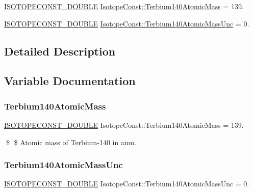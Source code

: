 \begin{DoxyCompactItemize}
\item 
\mbox{\hyperlink{group___isotope_const-_macros_ga8f45a7272ce02c0b4c65c44636ed719a}{I\+S\+O\+T\+O\+P\+E\+C\+O\+N\+S\+T\+\_\+\+D\+O\+U\+B\+LE}} \mbox{\hyperlink{group___isotope_const-_terbium-_tb140_ga8648710e17aa5d4e0621d2b32e031ee9}{Isotope\+Const\+::\+Terbium140\+Atomic\+Mass}} = 139.
\item 
\mbox{\hyperlink{group___isotope_const-_macros_ga8f45a7272ce02c0b4c65c44636ed719a}{I\+S\+O\+T\+O\+P\+E\+C\+O\+N\+S\+T\+\_\+\+D\+O\+U\+B\+LE}} \mbox{\hyperlink{group___isotope_const-_terbium-_tb140_gafd7dd55afe7f782f84767c1fdf59fb4a}{Isotope\+Const\+::\+Terbium140\+Atomic\+Mass\+Unc}} = 0.
\end{DoxyCompactItemize}


\subsection{Detailed Description}


\subsection{Variable Documentation}
\mbox{\label{group___isotope_const-_terbium-_tb140_ga8648710e17aa5d4e0621d2b32e031ee9}} 
\subsubsection{\texorpdfstring{Terbium140\+Atomic\+Mass}{Terbium140AtomicMass}}
{\footnotesize\ttfamily \mbox{\hyperlink{group___isotope_const-_macros_ga8f45a7272ce02c0b4c65c44636ed719a}{I\+S\+O\+T\+O\+P\+E\+C\+O\+N\+S\+T\+\_\+\+D\+O\+U\+B\+LE}} Isotope\+Const\+::\+Terbium140\+Atomic\+Mass = 139.}

\$ \$ Atomic mass of Terbium-\/140 in amu. \mbox{\label{group___isotope_const-_terbium-_tb140_gafd7dd55afe7f782f84767c1fdf59fb4a}} 
\subsubsection{\texorpdfstring{Terbium140\+Atomic\+Mass\+Unc}{Terbium140AtomicMassUnc}}
{\footnotesize\ttfamily \mbox{\hyperlink{group___isotope_const-_macros_ga8f45a7272ce02c0b4c65c44636ed719a}{I\+S\+O\+T\+O\+P\+E\+C\+O\+N\+S\+T\+\_\+\+D\+O\+U\+B\+LE}} Isotope\+Const\+::\+Terbium140\+Atomic\+Mass\+Unc = 0.}

